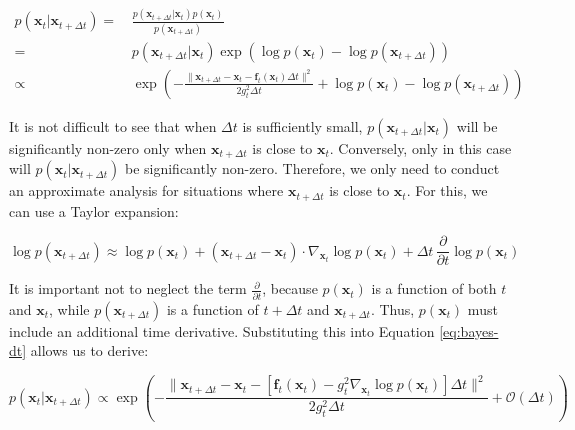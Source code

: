 \begin{equation}
\begin{aligned}
p(\mathbf{x}_t|\mathbf{x}_{t+\Delta t}) =&\, \frac{p(\mathbf{x}_{t+\Delta t}|\mathbf{x}_t) p(\mathbf{x}_t)}{p(\mathbf{x}_{t+\Delta t})} \\
=&\, p(\mathbf{x}_{t+\Delta t}|\mathbf{x}_t) \exp\left(\log p(\mathbf{x}_t) - \log p(\mathbf{x}_{t+\Delta t})\right) \\
\propto&\, \exp\left(-\frac{\|\mathbf{x}_{t+\Delta t} - \mathbf{x}_t - \mathbf{f}_t(\mathbf{x}_t) \Delta t\|^2}{2 g_t^2 \Delta t} + \log p(\mathbf{x}_t) - \log p(\mathbf{x}_{t+\Delta t})\right)
\end{aligned} \label{eq:bayes-dt}
\end{equation}

It is not difficult to see that when \( \Delta t \) is sufficiently small, \( p(\mathbf{x}_{t+\Delta t}|\mathbf{x}_t) \) will be significantly non-zero only when \( \mathbf{x}_{t+\Delta t} \) is close to \( \mathbf{x}_t \). Conversely, only in this case will \( p(\mathbf{x}_t|\mathbf{x}_{t+\Delta t}) \) be significantly non-zero. Therefore, we only need to conduct an approximate analysis for situations where \( \mathbf{x}_{t+\Delta t} \) is close to \( \mathbf{x}_t \). For this, we can use a Taylor expansion:

\begin{equation}
\log p(\mathbf{x}_{t+\Delta t}) \approx \log p(\mathbf{x}_t) + (\mathbf{x}_{t+\Delta t} - \mathbf{x}_t) \cdot \nabla_{\mathbf{x}_t} \log p(\mathbf{x}_t) + \Delta t \, \frac{\partial}{\partial t} \log p(\mathbf{x}_t)
\end{equation}

It is important not to neglect the term \( \frac{\partial}{\partial t} \), because \( p(\mathbf{x}_t) \) is a function of both \( t \) and \( \mathbf{x}_t \), while \( p(\mathbf{x}_{t+\Delta t}) \) is a function of \( t + \Delta t \) and \( \mathbf{x}_{t+\Delta t} \). Thus, \( p(\mathbf{x}_t) \) must include an additional time derivative. Substituting this into Equation \eqref{eq:bayes-dt} allows us to derive:

\begin{equation}
p(\mathbf{x}_t|\mathbf{x}_{t+\Delta t}) \propto \exp\left(-\frac{\|\mathbf{x}_{t+\Delta t} - \mathbf{x}_t - \left[\mathbf{f}_t(\mathbf{x}_t) - g_t^2 \nabla_{\mathbf{x}_t} \log p(\mathbf{x}_t) \right] \Delta t\|^2}{2 g_t^2 \Delta t} + \mathcal{O}(\Delta t)\right)
\end{equation}

